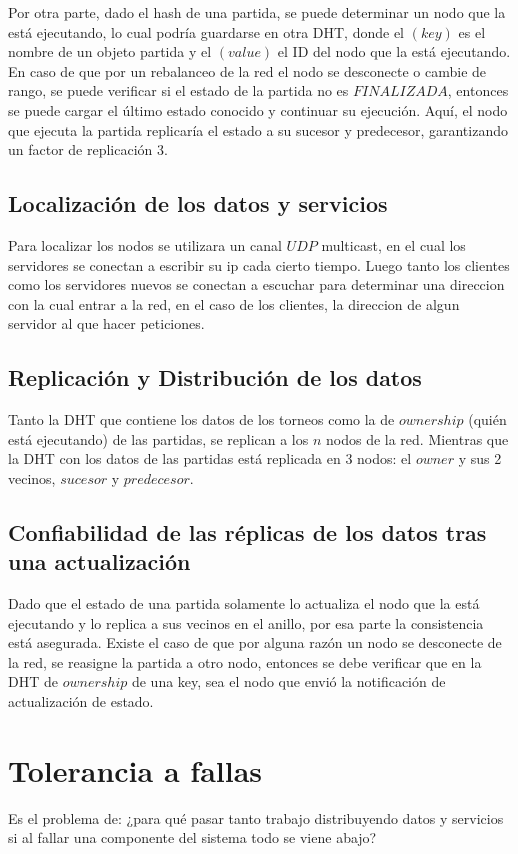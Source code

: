 \documentclass{article}
\begin{document}
Por otra parte, dado el hash de una partida, se puede determinar un nodo que la está ejecutando, lo cual podría guardarse en otra DHT, donde el $(key)$ es el nombre de un objeto partida y el $(value)$ el ID del nodo que la está ejecutando. En caso de que por un rebalanceo de la red el nodo se desconecte o cambie de rango, se puede verificar si el estado de la partida no es $FINALIZADA$, entonces se puede cargar el último estado conocido y continuar su ejecución. Aquí, el nodo que ejecuta la partida replicaría el estado a su sucesor y predecesor, garantizando un factor de replicación 3.

\subsection{Localización de los datos y servicios}
Para localizar los nodos se utilizara un canal $UDP$ multicast, en el cual los servidores se conectan a escribir su ip cada cierto tiempo. Luego tanto los clientes como los servidores nuevos se conectan a escuchar para determinar una direccion con la cual entrar a la red, en el caso de los clientes, la direccion de algun servidor al que hacer peticiones.

\subsection{Replicación y Distribución de los datos}
Tanto la DHT que contiene los datos de los torneos como la de $ownership$ (quién está ejecutando) de las partidas, se replican a los $n$ nodos de la red.
Mientras que la DHT con los datos de las partidas está replicada en 3 nodos: el $owner$ y sus 2 vecinos, $sucesor$ y $predecesor$.

\subsection{Confiabilidad de las réplicas de los datos tras una actualización}
Dado que el estado de una partida solamente lo actualiza el nodo que la está ejecutando y lo replica a sus vecinos en el anillo, por esa parte la consistencia está asegurada. Existe el caso de que por alguna razón un nodo se desconecte de la red, se reasigne la partida a otro nodo, entonces se debe verificar que en la DHT de $ownership$ de una key, sea el nodo que envió la notificación de actualización de estado.

\section{Tolerancia a fallas}
Es el problema de: ¿para qué pasar tanto trabajo distribuyendo datos y servicios si al fallar una componente del sistema todo se viene abajo?
\end{document}
